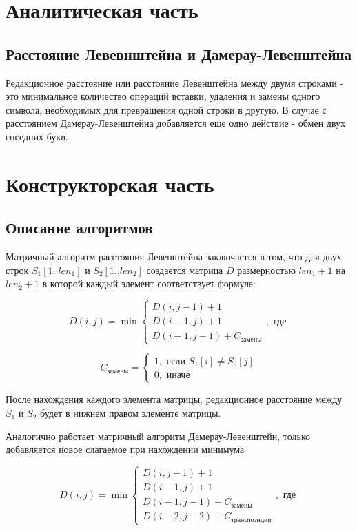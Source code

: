 ﻿\documentclass[a4paper,12pt]{article}
\begin{document}
    \newpage
    \section{Аналитическая часть}
    \subsection{Расстояние Левевнштейна и Дамерау-Левенштейна}

    Редакционное расстояние или расстояние Левенштейна между двумя строками - это минимальное количество операций вставки, удаления и замены одного символа, необходимых для превращения одной строки в другую. В случае с расстоянием Дамерау-Левенштейна добавляется еще одно действие - обмен двух соседних букв.

    \newpage
    \section{Конструкторская часть}
    \subsection{Описание алгоритмов}

    Матричный алгоритм расстояния Левенштейна заключается в том, что для двух строк $S_1[1..len_1]$ и $S_2[1..len_2]$ создается матрица $D$ размерностью $len_1 + 1$ на $len_2 + 1$ в которой каждый элемент соответствует формуле:

    $$
    D(i,j) = \min 
    \begin{cases}
        D(i, j-1) + 1 \\
        D(i-1, j) + 1 \\
        D(i-1, j-1) + C_\text{замены}
    \end{cases}, \text{ где } 
    $$

    $$
    C_\text{замены} = 
    \begin{cases}
        1, \text{ если } S_1[i] \ne S_2[j] \\
        0, \text{ иначе}
    \end{cases}
    $$

    После нахождения каждого элемента матрицы, редакционное расстояние между $S_1$ и $S_2$ будет в нижнем правом элементе матрицы.

    Аналогично работает матричный алгоритм Дамерау-Левенштейн, только добавляется новое слагаемое при нахождении минимума

    $$
    D(i,j) = \min 
    \begin{cases}
        D(i, j-1) + 1 \\
        D(i-1, j) + 1 \\
        D(i-1, j-1) + C_\text{замены} \\
        D(i-2, j-2) + C_\text{транспозиции}
    \end{cases}, \text{ где }
    $$
\end{document}
